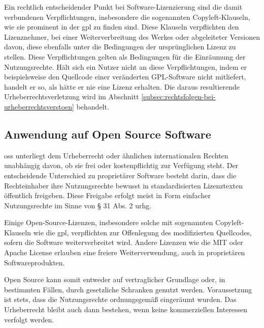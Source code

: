 Ein rechtlich entscheidender Punkt bei Software-Lizenzierung sind die damit verbundenen Verpflichtungen, insbesondere die sogenannten Copyleft-Klauseln, wie sie prominent in der \gls{gpl} zu finden sind.
Diese Klauseln verpflichten den Lizenznehmer, bei einer Weiterverbreitung des Werkes oder abgeleiteter Versionen davon, diese ebenfalls unter die Bedingungen der ursprünglichen Lizenz zu stellen.
Diese Verpflichtungen gelten als Bedingungen für die Einräumung der Nutzungsrechte.
Hält sich ein Nutzer nicht an diese Verpflichtungen, indem er beispielsweise den Quellcode einer veränderten GPL-Software nicht mitliefert, handelt er so, als hätte er nie eine Lizenz erhalten.
Die daraus resultierende Urheberrechtsverletzung wird im Abschnitt \ref{subsec:rechtsfolgen-bei-urheberrechtsverstoen} behandelt.


\subsection{Anwendung auf Open Source Software}

\gls{oss} unterliegt dem Urheberrecht oder ähnlichen internationalen Rechten unabhängig davon, ob sie frei oder kostenpflichtig zur Verfügung steht.
Der entscheidende Unterschied zu proprietärer Software besteht darin, dass die Rechteinhaber ihre Nutzungsrechte bewusst in standardisierten Lizenztexten öffentlich freigeben.
Diese Freigabe erfolgt meist in Form einfacher Nutzungsrechte im Sinne von § 31 Abs. 2 \gls{urhg}.

Einige Open-Source-Lizenzen, insbesondere solche mit sogenannten Copyleft-Klauseln wie die \gls{gpl}, verpflichten zur Offenlegung des modifizierten Quellcodes, sofern die Software weiterverbreitet wird.
Andere Lizenzen wie die MIT oder Apache License erlauben eine freiere Weiterverwendung, auch in proprietären Softwareprodukten.

Open Source kann somit entweder auf vertraglicher Grundlage oder, in bestimmten Fällen, durch gesetzliche Schranken genutzt werden.
Voraussetzung ist stets, dass die Nutzungsrechte ordnungsgemäß eingeräumt wurden.
Das Urheberrecht bleibt auch dann bestehen, wenn keine kommerziellen Interessen verfolgt werden.


